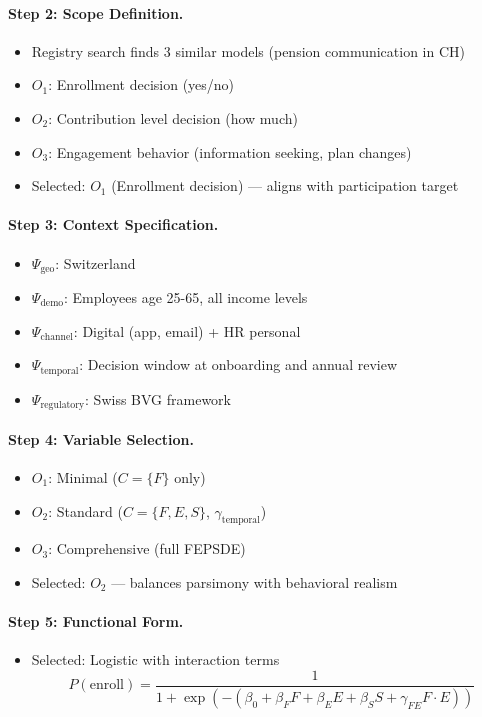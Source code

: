 \paragraph{Step 2: Scope Definition.}
\begin{itemize}
\item Registry search finds 3 similar models (pension communication in CH)
\item $O_1$: Enrollment decision (yes/no)
\item $O_2$: Contribution level decision (how much)
\item $O_3$: Engagement behavior (information seeking, plan changes)
\item Selected: $O_1$ (Enrollment decision) --- aligns with participation target
\end{itemize}

\paragraph{Step 3: Context Specification.}
\begin{itemize}
\item $\Psi_{\text{geo}}$: Switzerland
\item $\Psi_{\text{demo}}$: Employees age 25-65, all income levels
\item $\Psi_{\text{channel}}$: Digital (app, email) + HR personal
\item $\Psi_{\text{temporal}}$: Decision window at onboarding and annual review
\item $\Psi_{\text{regulatory}}$: Swiss BVG framework
\end{itemize}

\paragraph{Step 4: Variable Selection.}
\begin{itemize}
\item $O_1$: Minimal ($C = \{F\}$ only)
\item $O_2$: Standard ($C = \{F, E, S\}$, $\gamma_{\text{temporal}}$)
\item $O_3$: Comprehensive (full FEPSDE)
\item Selected: $O_2$ --- balances parsimony with behavioral realism
\end{itemize}

\paragraph{Step 5: Functional Form.}
\begin{itemize}
\item Selected: Logistic with interaction terms
\begin{equation}
P(\text{enroll}) = \frac{1}{1 + \exp(-(\beta_0 + \beta_F F + \beta_E E + \beta_S S + \gamma_{FE} F \cdot E))}
\end{equation}
\end{itemize}

